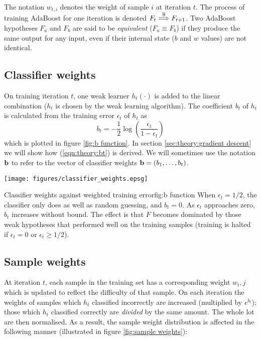 The notation $w_{t,i}$ denotes the weight of sample $i$ at iteration
$t$.  The process of training AdaBoost for one iteration is denoted $F_t
\stackrel{\mathbb{B}}{\Longrightarrow} F_{t+1}$.   Two AdaBoost hypotheses $F_a$ and $F_b$ are
said to be \emph{equivalent} ($F_a \equiv F_b$) if they produce the
same output for any input, even if their internal state ($b$ and $w$
values) are not identical.

\subsection{Classifier weights}
\label{sec:classifier weights}

On training iteration $t$, one weak learner $h_t(\cdot)$ is added to
the linear combination ($h_t$ is chosen by the weak learning
algorithm).  The coefficient $b_t$ of $h_t$ is calculated from the 
training error $\epsilon_t$ of $h_t$ as 
%
\begin{equation}
b_t = - \frac{1}{2} \log \left( \frac{\epsilon_t}{1 - \epsilon_t} \right)
\label{eqn:theory:bt}
\end{equation}
%
which is plotted in figure \ref{fig:b function}.  In section
\ref{sec:theory:gradient descent} we will show how
(\ref{eqn:theory:bt}) is derived.  We will sometimes use the notation
$\mathbf{b}$ to refer to the vector of classifier weights $\mathbf{b} = (b_1,
\ldots, b_t)$.

\begin{linefigure}
\begin{center}
\texttt{[image: figures/classifier\_weights.epsg]}
\end{center}
\begin{capt}{Classifier weights against weighted training error}{fig:b
function}
When $\epsilon_t = 1/2$, the classifier only does as well as random
guessing, and $b_t = 0$.  As $\epsilon_t$ approaches zero, $b_t$
increases without bound.  The effect is that $F$ becomes dominated by
those weak hypotheses that performed well on the training samples
(training is halted if $\epsilon_t = 0$ or $\epsilon_t \geq
1/2$).
\end{capt}
\end{linefigure}


\subsection{Sample weights}
\label{sec:sample weights}

At iteration $t$, each sample in the training set has a corresponding
weight $w_t,j$ which is updated to reflect the difficulty of that
sample.  On each iteration the weights of samples which $h_t$
classified incorrectly are increased (multiplied by $e^{b_t}$); those
which $h_t$ classified correctly are \emph{divided} by the same
amount.  The whole lot are then normalised. As a result, the sample
weight distribution is affected in the following manner (illustrated
in figure \ref{fig:sample weights}): 

